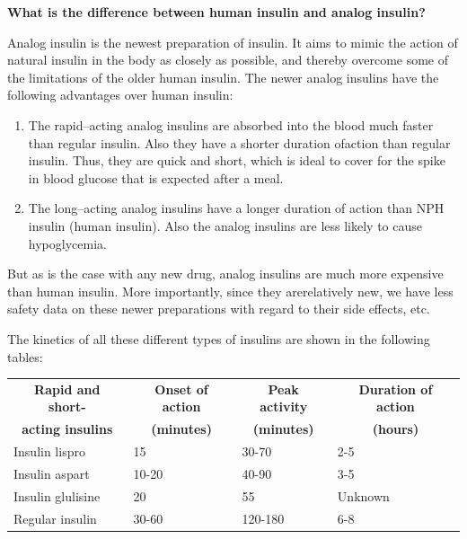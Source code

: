 \noindent\textbf{What is the difference between human insulin and analog insulin?}

Analog insulin is the newest preparation of insulin. It aims to mimic the action of natural insulin in the body as closely as possible, and thereby overcome some of the limitations of the older human insulin. The newer analog insulins have the following advantages over human insulin:

\vspace{-\topsep}
\begin{enumerate}[•]
\itemsep=0pt
\item The rapid–acting analog insulins are absorbed into the blood much faster than regular insulin. Also they have a shorter duration of\break action than regular insulin. Thus, they are quick and short, which is ideal to cover for the spike in blood glucose that is expected after a meal.
\item The long–acting analog insulins have a longer duration of action than NPH insulin (human insulin). Also the analog insulins are less likely to cause hypoglycemia.
\end{enumerate}
\vspace{-\topsep}

But as is the case with any new drug, analog insulins are much more expensive than human insulin. More importantly, since they are\break relatively new, we have less safety data on these newer preparations with regard to their side effects, etc.

The kinetics of all these different types of insulins are shown in the following tables:

\vspace{-\topsep}
{
\begin{center}
\small\addtolength{\tabcolsep}{-2pt}
\begin{longtable}{|l|l|l|l|}
\hline
\multicolumn{1}{|c|}{\textbf{Rapid and short-}} & \multicolumn{1}{c|}{\textbf{Onset of action}} & \multicolumn{1}{c|}{\textbf{Peak activity}} & \multicolumn{1}{c|}{\textbf{Duration of action}}\\
\multicolumn{1}{|c|}{\textbf{acting insulins}} & \multicolumn{1}{c|}{\textbf{(minutes)}} & \multicolumn{1}{c|}{\textbf{(minutes)}} & \multicolumn{1}{c|}{\textbf{(hours)}}\\
\hline
Insulin lispro & 15 & 30-70 & 2-5\\
\hline
Insulin aspart & 10-20 & 40-90 & 3-5\\
\hline
Insulin glulisine & 20 & 55 & Unknown\\
\hline
Regular insulin & 30-60 & 120-180 & 6-8\\
\hline
\end{longtable}
\end{center}
}\relax

